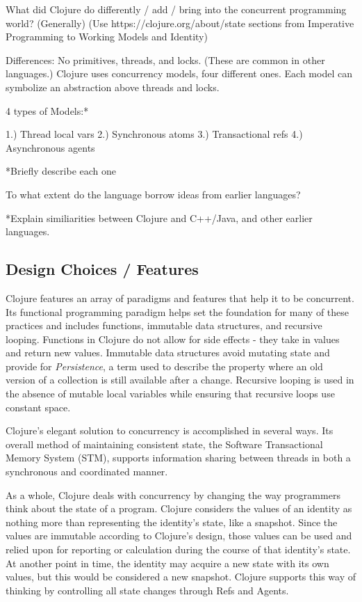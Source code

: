     What did Clojure do differently / add / bring into the concurrent programming world? (Generally)
        (Use https://clojure.org/about/state sections from Imperative Programming to Working Models and Identity)
        \cite{website:clojure-lang-reference}

    Differences: No primitives, threads, and locks. (These are common in other languages.) Clojure uses concurrency models, four different ones. Each model can symbolize an abstraction above threads and locks.

    4 types of Models:*

    1.) Thread local vars
    2.) Synchronous atoms
    3.) Transactional refs
    4.) Asynchronous agents

    *Briefly describe each one

    To what extent do the language borrow ideas from earlier languages?

    *Explain similiarities between Clojure and C++/Java, and other earlier languages.

    \cite{galpin_2010}


\subsection{Design Choices / Features}

   Clojure features an array of paradigms and features that help it to be concurrent. Its functional programming paradigm helps set the foundation for many of these practices and includes functions, immutable data structures, and recursive looping. Functions in Clojure do not allow for side effects - they take in values and return new values. Immutable data structures avoid mutating state and provide for \textit{Persistence}, a term used to describe the property where an old version of a collection is still available after a change. Recursive looping is used in the absence of mutable local variables while ensuring that recursive loops use constant space.

    Clojure's elegant solution to concurrency is accomplished in several ways. Its overall method of maintaining consistent state, the Software Transactional Memory System (STM), supports information sharing between threads in both  a synchronous and coordinated manner.

    As a whole, Clojure deals with concurrency by changing the way programmers think about the state of a program. Clojure considers the values of an identity as nothing more than representing the identity's state, like a snapshot. Since the values are immutable according to Clojure's design, those values can be used and relied upon for reporting or calculation during the course of that identity's state. At another point in time, the identity may acquire a new state with its own values, but this would be considered a new snapshot. Clojure supports this way of thinking by controlling all state changes through Refs and Agents.

